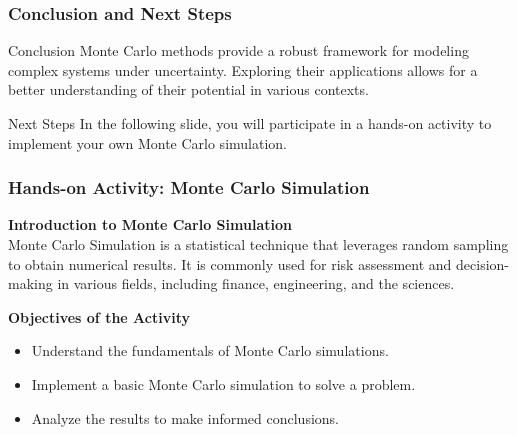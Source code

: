 \documentclass[aspectratio=169]{beamer}
\begin{document}
\begin{frame}[fragile]
    \frametitle{Conclusion and Next Steps}

    \begin{block}{Conclusion}
        Monte Carlo methods provide a robust framework for modeling complex systems under uncertainty. Exploring their applications allows for a better understanding of their potential in various contexts.
    \end{block}

    \begin{block}{Next Steps}
        In the following slide, you will participate in a hands-on activity to implement your own Monte Carlo simulation.
    \end{block}
\end{frame}

\begin{frame}[fragile]
    \frametitle{Hands-on Activity: Monte Carlo Simulation}
    
    \textbf{Introduction to Monte Carlo Simulation} \\
    Monte Carlo Simulation is a statistical technique that leverages random sampling to obtain numerical results. It is commonly used for risk assessment and decision-making in various fields, including finance, engineering, and the sciences.

    \textbf{Objectives of the Activity}
    \begin{itemize}
        \item Understand the fundamentals of Monte Carlo simulations.
        \item Implement a basic Monte Carlo simulation to solve a problem.
        \item Analyze the results to make informed conclusions.
    \end{itemize}
\end{frame}
\end{document}
